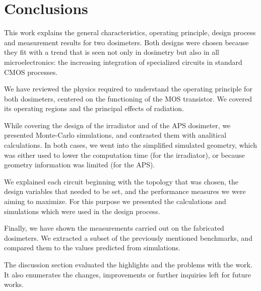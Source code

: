 \section{Conclusions}
This work explains the general characteristics,
operating principle, design process and measurement results
for two dosimeters.
Both designs were chosen because they fit with a trend that is seen 
not only in dosimetry but also in all microelectronics:
the increasing integration of specialized circuits in standard CMOS processes.

We have reviewed the physics required to understand the operating principle for both dosimeters,
centered on the functioning of the MOS transistor. 
We covered its operating regions and the principal effects of radiation.

While covering the design of the irradiator and of the APS dosimeter,
we presented Monte-Carlo simulations,
and contrasted them with analitical calculations.
In both cases, we went into the simplified simulated geometry,
which was either used to lower the computation time (for the irradiator),
or because geometry information was limited (for the APS).

We explained each circuit beginning with the topology that was chosen,
the design variables that needed to be set,
and the performance measures we were aiming to maximize.
For this purpose we presented the calculations and simulations which were used in the design process.

Finally, we have shown the measurements carried out on the fabricated dosimeters.
We extracted a subset of the previously mentioned benchmarks,
and compared them to the values predicted from simulations.

The discussion section evaluated the highlights and the problems with the work.
It also enumerates the changes, improvements or further inquiries left for future works.
